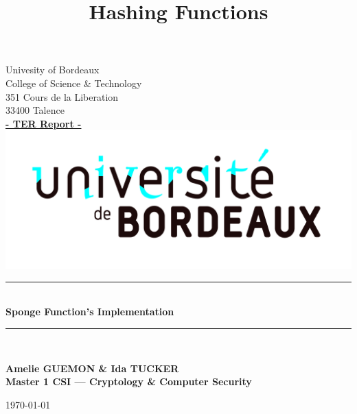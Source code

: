 \documentclass[10.5pt, a4paper, twoside, openright]{report}
\title{Hashing Functions}
\author{}
\newcommand{\HRule}{\rule{\linewidth}{0.5mm}}
\begin{document}
\begin{titlepage}
  \begin{sffamily}
  \begin{center}

    Univesity of Bordeaux\\College of Science \& Technology\\
           351 Cours de la Liberation\\33400 Talence\\[1em]
            \textbf{\underline{- TER Report -}}\\[1.5cm]
           
    \includegraphics[scale=0.11]{UB.jpg}
    \\[3cm]

    \HRule\\[0.3cm]
    { \huge \bfseries Sponge Function's Implementation\\[0.5cm] }
    \HRule\\
    \begin{flushright}
      \bfseries {Amelie GUEMON \& Ida TUCKER\\[1em]Master 1 CSI --- Cryptology \& Computer Security}\\[6.6cm]
    \end{flushright}
    
   
    \today

  \end{center}
  \end{sffamily}
\end{titlepage}

\cleardoublepage{}

\tableofcontents

















\begin{appendices}
  
\end{appendices}
\nocite{*}


\end{document}
